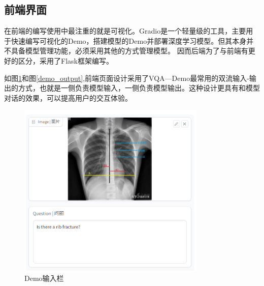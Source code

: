 \subsection{前端界面}
在前端的编写使用中最注重的就是可视化。Gradio是一个轻量级的工具，主要用于快速编写可视化的Demo，搭建模型的Demo并部署深度学习模型。但其本身并不具备模型管理功能，必须采用其他的方式管理模型。
因而后端为了与前端有更好的区分，采用了Flask框架编写。

如图\ref{demo_input}和图\ref{demo_output},前端页面设计采用了VQA—Demo最常用的双流输入-输出的方式，也就是一侧负责模型输入，一侧负责模型输出。这种设计更具有和模型对话的效果，可以提高用户的交互体验。
\begin{figure}[htbp]
	\begin{minipage}{0.5\linewidth}
		\centering	
		\includegraphics[width=0.8\textwidth]{Fig/myfig/chapter5/demo_input.png}  %
		\caption{\label{demo_input}Demo输入栏} 	
	\end{minipage}
	\begin{minipage}{0.5\linewidth}
		\centering	

\end{minipage}
\end{figure}
